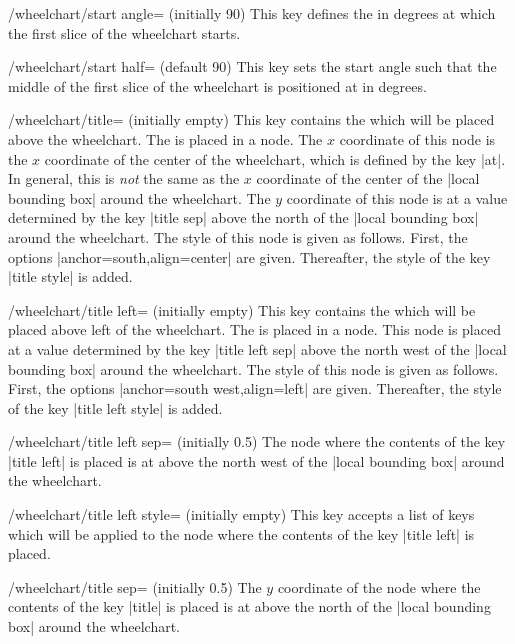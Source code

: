 \documentclass[a4paper,english,dvipsnames]{ltxdoc}
\begin{document}
\begin{key}{/wheelchart/start angle= (initially 90)}
This key defines the  in degrees at which the first slice of the wheelchart starts.
\end{key}
\begin{key}{/wheelchart/start half= (default 90)}
This key sets the start angle such that the middle of the first slice of the wheelchart is positioned at  in degrees.
\end{key}
\begin{key}{/wheelchart/title= (initially \normalfont empty)}
This key contains the  which will be placed above the wheelchart. The  is placed in a node. The $x$ coordinate of this node is the $x$ coordinate of the center of the wheelchart, which is defined by the key |at|. In general, this is \emph{not} the same as the $x$ coordinate of the center of the |local bounding box| around the wheelchart. The $y$ coordinate of this node is at a value determined by the key |title sep| above the north of the |local bounding box| around the wheelchart. The style of this node is given as follows. First, the options |anchor=south,align=center| are given. Thereafter, the style of the key |title style| is added.
\end{key}
\begin{key}{/wheelchart/title left= (initially \normalfont empty)}
This key contains the  which will be placed above left of the wheelchart. The  is placed in a node. This node is placed at a value determined by the key |title left sep| above the north west of the |local bounding box| around the wheelchart. The style of this node is given as follows. First, the options |anchor=south west,align=left| are given. Thereafter, the style of the key |title left style| is added.
\end{key}
\begin{key}{/wheelchart/title left sep= (initially 0.5)}
The node where the contents of the key |title left| is placed is at  above the north west of the |local bounding box| around the wheelchart.
\end{key}
\begin{stylekey}{/wheelchart/title left style= (initially \normalfont empty)}
This key accepts a list of keys which will be applied to the node where the contents of the key |title left| is placed.
\end{stylekey}
\begin{key}{/wheelchart/title sep= (initially 0.5)}
The $y$ coordinate of the node where the contents of the key |title| is placed is at  above the north of the |local bounding box| around the wheelchart.
\end{key}
\end{document}
